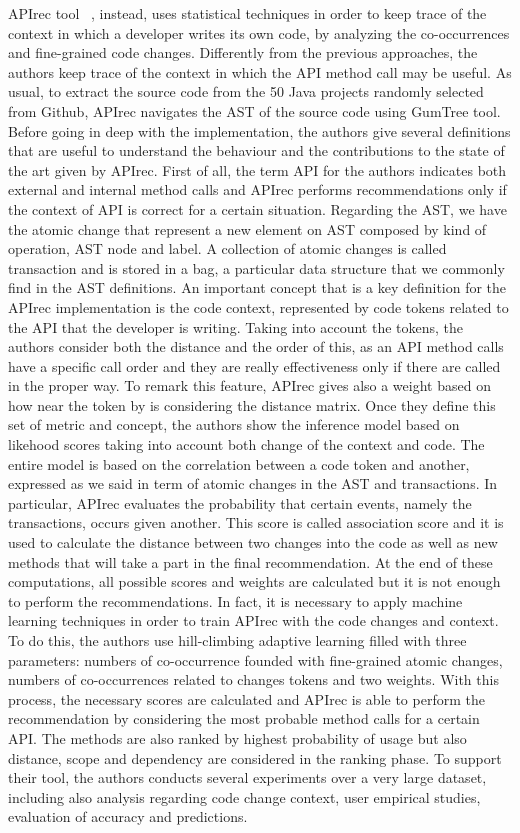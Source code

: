 APIrec tool  ~\cite{nguyen_api_2016}, instead, uses statistical techniques in order to keep trace of the context in which a developer writes its own code, by analyzing the co-occurrences and fine-grained code changes. Differently from the previous approaches, the authors keep trace of the context in which the API method call may be useful. As usual, to extract the source code from the 50 Java projects randomly selected from Github, APIrec navigates the AST of the source code using GumTree tool. Before going in deep with the implementation, the authors give several definitions that are useful to understand the behaviour and the contributions to the state of the art given by APIrec. First of all, the term API for the authors indicates both external and internal method calls and APIrec performs recommendations only if the context of API is correct for a certain situation. Regarding the AST, we have the atomic change that represent a new element on AST composed by kind of operation, AST node and label. A collection of atomic changes is called transaction and is stored in a bag, a particular data structure that we commonly find in the AST definitions. An important concept that is a key definition for the APIrec implementation is the code context, represented by code tokens related to the API that the developer is writing. Taking into account the tokens, the authors consider both the distance and the order of this, as an API method calls have a specific call order and they are really effectiveness only if there are called in the proper way. To remark this feature, APIrec gives also a weight based on how near the token by is considering the distance matrix. Once they define this set of metric and concept, the authors show the inference model based on likehood scores taking into account both change of the context and code.\newline
The entire model is based on the correlation between a code token and another, expressed as we said in term of atomic changes in the AST and transactions. In particular, APIrec evaluates the probability that certain events, namely the transactions, occurs given another. This score is called association score and it is used to calculate the distance between two changes into the code as well as new methods that will take a part in the final recommendation. At the end of these computations, all possible scores and weights are calculated but it is not enough to perform the recommendations. In fact, it is necessary to apply machine learning techniques in order to train APIrec with the code changes and context. To do this, the authors use hill-climbing adaptive learning filled with three parameters: numbers of co-occurrence founded with fine-grained atomic changes, numbers of co-occurrences related to changes tokens and two weights. With this process, the necessary scores are calculated and APIrec is able to perform the recommendation by considering the most probable method calls for a certain API. The methods are also ranked by highest probability of usage but also distance, scope and dependency are considered in the ranking phase. To support their tool, the authors conducts several experiments over a very large dataset, including also analysis regarding code change context, user empirical studies, evaluation of accuracy and predictions.
